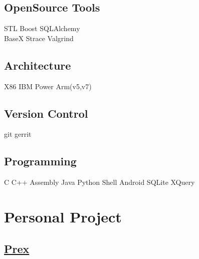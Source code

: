 \documentclass[letterpaper]{deedy-resume} %
\begin{document}
\begin{minipage}[t]{0.33\textwidth}
\subsection{OpenSource Tools}
STL \textbullet{} Boost \textbullet SQLAlchemy \textbullet \\
BaseX \textbullet{} Strace \textbullet{} Valgrind

\subsection{Architecture}
X86 \textbullet{} IBM Power \textbullet{} Arm(v5,v7)

\subsection{Version Control}
git \textbullet{} gerrit

\subsection{Programming}
C \textbullet{} C++ \textbullet{} Assembly \textbullet{} Java \textbullet{} Python
Shell \textbullet{} Android \textbullet{} SQLite \textbullet XQuery

\sectionspace %

\section{Personal Project} 

\subsection{\href{https://github.com/m943040028/prex}{\bf Prex}}

\sectionspace %


\end{minipage} %
\hfill
%
%
\end{document}
